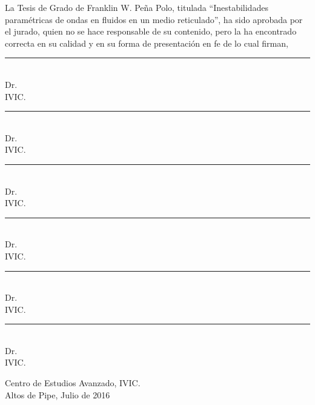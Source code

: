\thispagestyle{empty}

La Tesis de Grado de Franklin W. Pe\~na Polo, titulada ``Inestabilidades paramétricas de ondas en fluidos en un medio reticulado'', ha sido aprobada por el jurado, quien no se hace responsable de su contenido, pero la ha encontrado correcta en su calidad y en su forma de presentación en fe de lo cual firman,
\vspace{2cm}
\begin{center}
\begin{multicols}{2}
\noindent\rule{5cm}{0.4pt}\\
Dr.\\
IVIC.

\vspace{2cm}
\noindent\rule{5cm}{0.4pt}\\
Dr.\\
IVIC.

\vspace{2cm}
\noindent\rule{5cm}{0.4pt}\\
Dr.\\
IVIC.

\vspace{2cm}
\noindent\rule{5cm}{0.4pt}\\
Dr.\\
IVIC.

\vspace{2cm}
\noindent\rule{5cm}{0.4pt}\\
Dr.\\
IVIC.

\vspace{2cm}
\noindent\rule{5cm}{0.4pt}\\
Dr.\\
IVIC.

\end{multicols}
\end{center}


\begin{flushright}
Centro de Estudios Avanzado, IVIC.\\
Altos de Pipe, Julio de 2016
\end{flushright}

\newpage